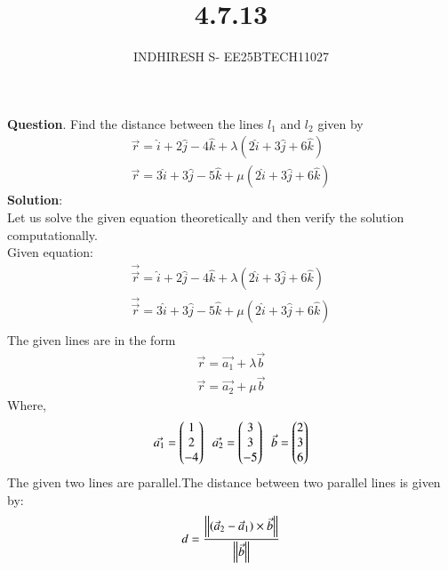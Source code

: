 \documentclass[journal]{IEEEtran}
\theoremstyle{remark}
\begin{document}

\onecolumn

\title{4.7.13}
\author{INDHIRESH S- EE25BTECH11027}
\maketitle


\renewcommand{\thefigure}{\theenumi}
\renewcommand{\thetable}{\theenumi}

\textbf{Question}.   Find the distance between the lines $l_1$ and $l_2$ given by
\begin{align*}
    \overrightarrow{r}=\hat{i}+2\hat{j}-4\hat{k}+\lambda(2\hat{i}+3\hat{j}+6\hat{k})\\\overrightarrow{r}=3\hat{i}+3\hat{j}-5\hat{k}+\mu(2\hat{i}+3\hat{j}+6\hat{k})
\end{align*}
\textbf{Solution}:\\
Let us solve the given equation theoretically and then verify the solution computationally. \\
Given equation:
\begin{align}
   \overrightarrow{\Vec{r}}=\hat{i}+2\hat{j}-4\hat{k}+\lambda(2\hat{i}+3\hat{j}+6\hat{k}) \\
\overrightarrow{\Vec{r}}=3\hat{i}+3\hat{j}-5\hat{k}+\mu(2\hat{i}+3\hat{j}+6\hat{k})\\
\end{align}
The given lines are in the form
\begin{align}
   \Vec{r} = \Vec{a_1} + \lambda\Vec{b}\\
   \Vec{r} = \Vec{a_2} + \mu\Vec{b}
\end{align}
Where,
\begin{align}
    \Vec{a_1}=\begin{pmatrix}1\\2\\-4\end{pmatrix}\;\;\Vec{a_2}=\begin{pmatrix}3\\3\\-5\end{pmatrix}\;\;\Vec{b}=\begin{pmatrix}2\\3\\6\end{pmatrix}
\end{align}
The given two lines are parallel.The distance between two parallel lines is given by:
\begin{align}
     d = \frac{\left\lVert(\Vec{a}_2 - \Vec{a}_1) \times \Vec{b}\right\rVert}{\left\lVert\Vec{b}\right\rVert}
\end{align}
\end{document}
